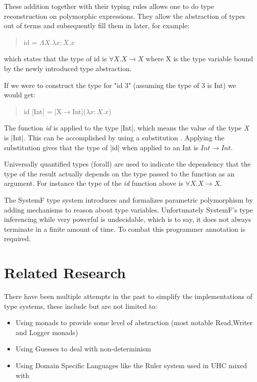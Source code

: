 These addition together with their typing rules allows one to do type reconstruction on polymorphic expressions. They allow the abstraction of types out of terms and subsequently fill them in later, for example:
\begin{quotation}
id = $\Lambda X.\lambda x:X. x$
\end{quotation}
which states that the type of id is $\forall X. X \rightarrow X$ where X is the type variable bound by the newly introduced type abstraction. 

If we were to construct the type for "id 3" (assuming the type of 3 is Int) we would get:

\begin{quotation}
id [Int] = [X$\rightarrow$Int]($\lambda x:X. x$)
\end{quotation}

The function \emph{id} is applied to the type |Int|, which means the value of the type \emph{X} is |Int|. This can be accomplished by using a substitution . Applying the substitution gives that the type of |id| when applied to an Int is $Int \rightarrow Int$.

Universally quantified types (forall) are used to indicate the dependency that the type of the result actually depends on the type passed to the function as an argument. For instance the type of the \textit{id} function above is $\forall X. X\rightarrow X$.

The SystemF type system introduces and formalizes parametric polymorphism by adding mechanisms to reason about type variables. Unfortunately SystemF's type inferencing while very powerful is undecidable, which is to say, it does not always terminate in a finite amount of time. To combat this programmer annotation is required.

\section{Related Research}
There have been multiple attempts in the past to simplify the implementations of type systems, these include but are not limited to:

\begin{itemize}
\item Using monads\cite{Monads} to provide some level of abstraction (most notable Read,Writer and Logger monads)
\item Using Guesses\cite{Guesses} to deal with non-determinism 
\item Using Domain Specific Languages like the Ruler\cite{Ruler} system used in UHC mixed with \ags
\end{itemize}

